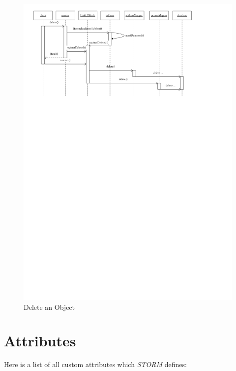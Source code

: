 			\begin{figure}
				\begin{center}
					\includegraphics{./files/inc/figures/DesignDelete}
					\caption{\label{fig:designDelete} Delete an Object}
				\end{center}
			\end{figure}
			
	\section{Attributes}
	\label{sec:attributes}
		Here is a list of all custom attributes which \textit{STORM} defines:
		
		
